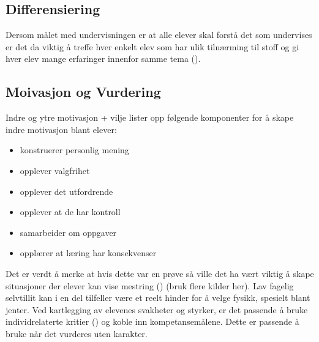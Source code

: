 \documentclass[main.tex]{subfiles}
\begin{document}
\subsection*{Differensiering}

Dersom målet med undervisningen er at alle elever skal forstå det som undervises er det da viktig å treffe
hver enkelt elev som har ulik tilnærming til stoff og gi hver elev mange erfaringer innenfor samme tema 
().

\subsection*{Moivasjon og Vurdering}

Indre og ytre motivasjon + vilje
\newline
\newline
\cite[s. 36 - 37]{froy10} lister opp følgende komponenter for å skape indre motivasjon blant elever:
\begin{itemize}
\item konstruerer personlig mening  
\item opplever valgfrihet
\item opplever det utfordrende
\item opplever at de har kontroll
\item samarbeider om oppgaver
\item opplærer at læring har konsekvenser
\end{itemize}
Det er verdt å merke at hvis dette var en prøve så ville det ha vært viktig å skape situasjoner der 
elever kan vise mestring () (bruk 
flere kilder her). 
\newline
\newline
Lav fagelig selvtillit kan i en del tilfeller være et reelt hinder for å velge fysikk, spesielt blant jenter.
\newline
\newline
Ved kartlegging av elevenes svakheter og styrker, er det passende å bruke individrelaterte kritier 
() og koble inn kompetansemålene. Dette er passende å bruke når det vurderes uten karakter. 
\end{document}
